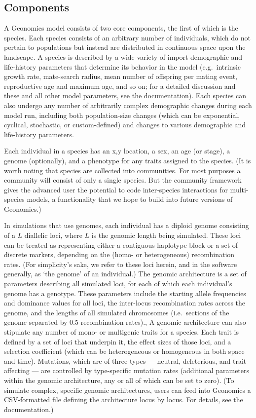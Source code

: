 ﻿\documentclass{article}
\begin{document}
\subsection{Components}
A Geonomics model consists of two core components, the first of which is the species.
Each species consists of an arbitrary number of individuals, which do not pertain to
populations but instead are distributed in continuous space upon the landscape.
A species is described by a wide variety of import demographic and life-history parameters
that determine its behavior in the model (e.g.\ intrinsic growth rate, mate-search radius,
mean number of offspring per mating event, reproductive age and maximum age, and so on;
for a detailed discussion and these and all other model parameters, see the documentation).
Each species can also undergo any number of arbitrarily complex demographic changes during
each model run, including both population-size changes
(which can be exponential, cyclical, stochastic, or custom-defined)
and changes to various demographic and life-history parameters.

Each individual in a species has an x,y location, a sex, an age (or stage),
a genome (optionally), and a phenotype for any traits assigned to the species.
(It is worth noting that species are collected into communities.
For most purposes a community will consist of
only a single species. But the community framework gives the advanced user the potential
to code inter-species interactions for multi-species models, a functionality that we hope
to build into future versions of Geonomics.)

In simulations that use genomes, each individual has a diploid genome consisting
of a $L$ diallelic loci, where $L$ is the genomic length being simulated.
These loci can be treated as representing either a contiguous haplotype block
or a set of discrete markers, depending on the (homo- or heterogeneous) recombination rates.
(For simplicity's sake, we refer to these loci herein, and in the software generally, as `the genome' of an individual.)
The genomic architecture is a set of parameters describing all simulated loci,
for each of which each individual's genome has a genotype.
These parameters include the starting allele frequencies and dominance values for all loci,
the inter-locus recombination rates across the genome, and the lengths of all simulated chromosomes
(i.e.\ sections of the genome separated by 0.5 recombination rates)., 
A genomic architecture can also stipulate any number of mono- or multigenic traits for a species.
Each trait is defined by a set of loci that underpin it, the effect sizes of those loci,
and a selection coefficient (which can be heterogeneous or homogeneous in both space and time).
Mutations, which are of three types --- neutral, deleterious, and trait-affecting --- are controlled by
type-specific mutation rates (additional parameters within the genomic architecture, any or all of which can be set to zero).
(To simulate complex, specific genomic architectures, users can feed into Geonomics a
CSV-formatted file defining the architecture locus by locus. For details, see the documentation.)
\end{document}
